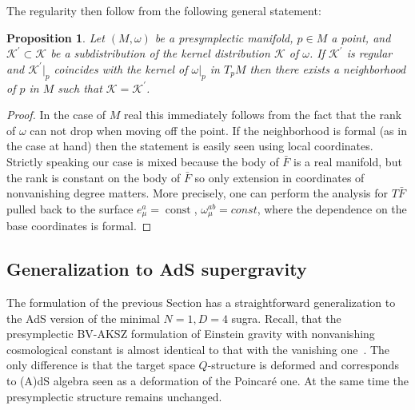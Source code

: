 \documentclass[a4paper,12pt]{article}
\numberwithin{equation}{section} %
\newtheorem{prop}[thm]{Proposition}
\def\const{\mathop\mathrm{const}\nolimits}
\def\cK{\mathcal{K}}
\numberwithin{equation}{section}
\begin{document}
The regularity then follow from the following general statement:
\begin{prop}
Let $(M,\omega)$ be a presymplectic manifold, $p\in M$  a point, and $\cK^\prime \subset \cK$ be a subdistribution of the kernel distribution $\cK$ of $\omega$. If $\cK^\prime$ is regular and $\cK^\prime|_p$ coincides with the kernel of $\omega|_p$ in $T_pM$ then there exists a neighborhood of $p$ in $M$ such that $\cK=\cK^\prime$. 
\end{prop}
\begin{proof}
In the case of $M$ real this immediately follows from the fact that the rank of $\omega$ can not drop when moving off the point. If the neighborhood is formal (as in the case at hand) then
the statement is easily seen using local coordinates. Strictly speaking our case is mixed because the body of $\bar F$ is a real manifold, but the rank is constant on the body  of $\bar F$ so only extension in coordinates of nonvanishing degree matters. More precisely, one can perform the analysis for $T\bar F$
pulled back to the surface $e^a_\mu=\const$, $\omega_\mu^{ab}=const$, where the dependence on the base coordinates is formal.  
\end{proof}

\subsection{Generalization to AdS supergravity}

The formulation of the previous Section has a straightforward generalization to the AdS version of the minimal $N=1,D=4$ sugra. Recall, that the presymplectic BV-AKSZ formulation of Einstein gravity with nonvanishing cosmological constant is almost identical to that with the vanishing one~\cite{Grigoriev:2020xec,Alkalaev:2013hta}. The only difference is that the target space $Q$-structure is deformed and corresponds to (A)dS algebra seen as a deformation of the Poincar\'e one. At the same time the presymplectic structure remains unchanged.
\end{document}

